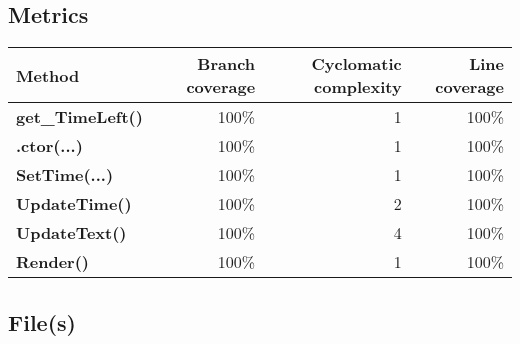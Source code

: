 \documentclass[a4paper,landscape,10pt]{article}
\begin{document}
\subsection{Metrics}
\begin{longtable}[l]{|l|r|r|r|}
\hline
\textbf{Method} & \textbf{Branch coverage} & \textbf{Cyclomatic complexity} & \textbf{Line coverage}\\
\hline
\textbf{get\_TimeLeft()} & 100\% & 1 & 100\%\\
\hline
\textbf{.ctor(...)} & 100\% & 1 & 100\%\\
\hline
\textbf{SetTime(...)} & 100\% & 1 & 100\%\\
\hline
\textbf{UpdateTime()} & 100\% & 2 & 100\%\\
\hline
\textbf{UpdateText()} & 100\% & 4 & 100\%\\
\hline
\textbf{Render()} & 100\% & 1 & 100\%\\
\hline
\end{longtable}
\subsection{File(s)}
\end{document}
